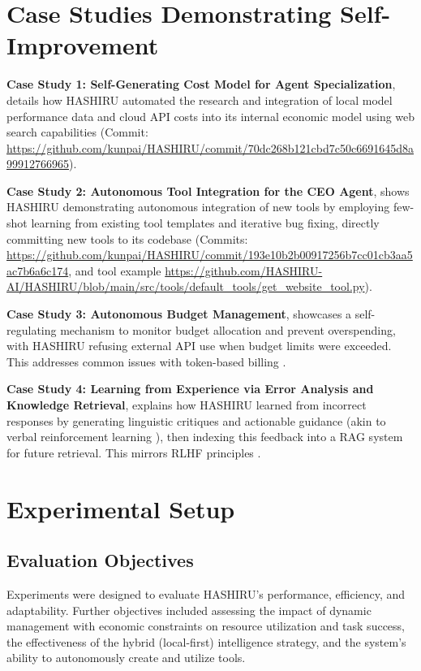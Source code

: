 \documentclass[twocolumn]{article}
\begin{document}
\section{Case Studies Demonstrating Self-Improvement}
\textbf{Case Study 1: Self-Generating Cost Model for Agent Specialization}, details how HASHIRU automated the research and integration of local model performance data and cloud API costs into its internal economic model using web search capabilities (Commit: \url{https://github.com/kunpai/HASHIRU/commit/70dc268b121cbd7c50c6691645d8a99912766965}).

\textbf{Case Study 2: Autonomous Tool Integration for the CEO Agent}, shows HASHIRU demonstrating autonomous integration of new tools by employing few-shot learning from existing tool templates and iterative bug fixing, directly committing new tools to its codebase (Commits: \url{https://github.com/kunpai/HASHIRU/commit/193e10b2b00917256b7cc01cb3aa5ac7b6a6c174}, and tool example \url{https://github.com/HASHIRU-AI/HASHIRU/blob/main/src/tools/default_tools/get_website_tool.py}).

\textbf{Case Study 3: Autonomous Budget Management}, showcases a self-regulating mechanism to monitor budget allocation and prevent overspending, with HASHIRU refusing external API use when budget limits were exceeded. This addresses common issues with token-based billing \cite{gemini_reddit, openai_sos, openai_costs}.

\textbf{Case Study 4: Learning from Experience via Error Analysis and Knowledge Retrieval}, explains how HASHIRU learned from incorrect responses by generating linguistic critiques and actionable guidance (akin to verbal reinforcement learning \cite{shinn2023reflexion}), then indexing this feedback into a RAG system \cite{lewis2021retrievalaugmentedgenerationknowledgeintensivenlp} for future retrieval. This mirrors RLHF principles \cite{ziegler2019fine, ouyang2022training}.

\section{Experimental Setup}

\subsection{Evaluation Objectives}
Experiments were designed to evaluate HASHIRU's performance, efficiency, and adaptability. Further objectives included assessing the impact of dynamic management with economic constraints on resource utilization and task success, the effectiveness of the hybrid (local-first) intelligence strategy, and the system's ability to autonomously create and utilize tools.
\end{document}
